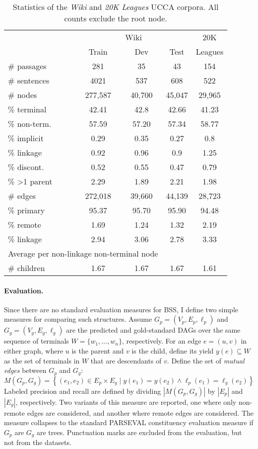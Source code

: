 \documentclass[12pt]{article}
\begin{document}
\begin{table}\small
  \centering
\begin{tabular}{l|ccc|c}
& \multicolumn{3}{c|}{Wiki} & 20K \\
& \small Train & \small Dev & \small Test & Leagues \\
\hline
\# passages & 281 & 35 & 43 & 154 \\
\# sentences & 4021 & 537 & 608 & 522 \\
\hline
\# nodes & 277,587 & 40,700 & 45,047 & 29,965 \\
\% terminal & 42.41 & 42.8 & 42.66 & 41.23 \\
\% non-term. & 57.59 & 57.20 & 57.34 & 58.77 \\
\% implicit & 0.29 & 0.35 & 0.27 & 0.8 \\
\% linkage & 0.92 & 0.96 & 0.9 & 1.25 \\
\% discont. & 0.52 & 0.55 & 0.47 & 0.79 \\
\% \textgreater 1 parent & 2.29 & 1.89 & 2.21 & 1.98 \\
\hline
\# edges & 272,018 & 39,660 & 44,139 & 28,723 \\
\% primary & 95.37 & 95.70 & 95.90 & 94.48 \\
\% remote & 1.69 & 1.24 & 1.32 & 2.19 \\
\% linkage & 2.94 & 3.06 & 2.78 & 3.33 \\
\hline
\multicolumn{3}{l}{\footnotesize Average per non-linkage non-terminal node} \\
\# children & 1.67 & 1.67 & 1.67 & 1.61 
\end{tabular}
\caption{Statistics of the \textit{Wiki} and \textit{20K Leagues} UCCA corpora.
All counts exclude the root node.
}
\label{table:data}
\end{table}

\paragraph{Evaluation.}
Since there are no standard evaluation measures for BSS, I define
two simple measures for comparing such structures.
Assume $G_p=(V_p,E_p,\ell_p)$ and $G_g=(V_g,E_g,\ell_g)$
are the predicted and gold-standard DAGs over the same
sequence of terminals $W = \{w_1,\ldots,w_n\}$, respectively.
For an edge $e=(u,v)$ in either graph,
where $u$ is the parent and $v$ is the child, define its yield $y(e) \subseteq W$ as the
set of terminals in $W$ that are descendants of $v$.
Define the set of \textit{mutual edges} between $G_p$ and $G_g$:
\[
  M(G_p,G_g) =
  \left\{(e_1,e_2) \in E_p \times E_g \;|\;
  y(e_1) = y(e_2) \wedge \ell_p(e_1)=\ell_g(e_2)\right\}
\]
Labeled precision and recall are defined by dividing $|M(G_p,G_g)|$ by $|E_p|$ and $|E_g|$, respectively.
Two variants of this measure are reported, one where only non-remote edges are considered,
and another where remote edges are considered. The measure collapses to the standard
PARSEVAL constituency evaluation measure if $G_p$ are $G_g$ are trees.
Punctuation marks are excluded from the evaluation, but not from the datasets.
\end{document}
